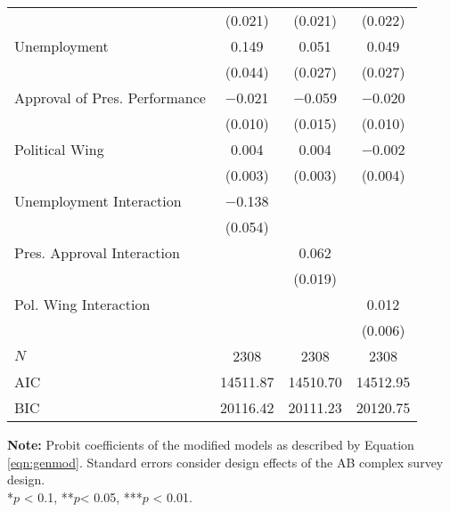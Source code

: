 \documentclass[12pt,a4]{article}
\begin{document}
\begin{table}[htbp]
\begin{center}
\begin{tabular}[t]{lccc}
 & (\num{0.021}) & (\num{0.021}) & (\num{0.022})\\
Unemployment & \num{0.149} & \num{0.051} & \num{0.049}\\
 & (\num{0.044}) & (\num{0.027}) & (\num{0.027})\\
Approval of Pres. Performance & \num{-0.021} & \num{-0.059} & \num{-0.020}\\
 & (\num{0.010}) & (\num{0.015}) & (\num{0.010})\\
Political Wing & \num{0.004} & \num{0.004} & \num{-0.002}\\
 & (\num{0.003}) & (\num{0.003}) & (\num{0.004})\\
Unemployment Interaction & \num{-0.138} &  & \\
 & (\num{0.054}) &  & \\
Pres. Approval Interaction &  & \num{0.062} & \\
 &  & (\num{0.019}) & \\
Pol. Wing Interaction &  &  & \num{0.012}\\
 &  &  & (\num{0.006})\\
\midrule
$N$ & \num{2308} & \num{2308} & \num{2308}\\
AIC & \num{14511.87} & \num{14510.70} & \num{14512.95}\\
BIC & \num{20116.42} & \num{20111.23} & \num{20120.75}\\
\bottomrule
\end{tabular}


\end{center}
\textbf{Note:} Probit coefficients of the modified models as described by Equation \ref{eqn:genmod}. Standard errors consider design effects of the AB complex survey design.\\
*$p$ < 0.1, **$p$< 0.05, ***$p$ < 0.01.
\end{table}
\end{document}
